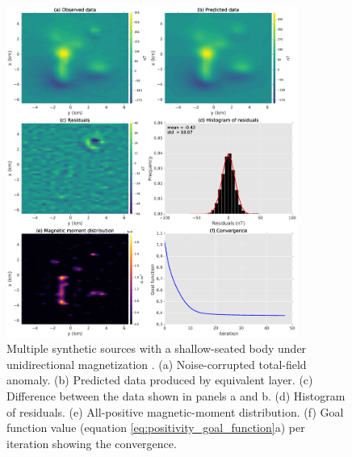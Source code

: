 \begin{figure}
	\centering
	\includegraphics[width=0.85\textwidth]{Fig/unidir_shallow_test/figure3.eps}
	\caption{Multiple synthetic sources with a shallow-seated body under unidirectional magnetization . (a) Noise-corrupted total-field anomaly. (b) Predicted data produced by equivalent layer. (c) Difference between the data shown in panels a and b. (d) Histogram of residuals. (e) All-positive magnetic-moment distribution. (f) Goal function value (equation \ref{eq:positivity_goal_function}a) per iteration showing the convergence.}
	\label{fig:unidir_shallow_test}
\end{figure}

